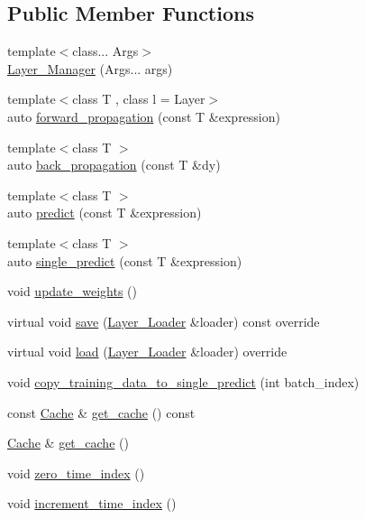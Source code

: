 \subsection*{Public Member Functions}
\begin{DoxyCompactItemize}
\item 
{\footnotesize template$<$class... Args$>$ }\\\hyperlink{structbc_1_1nn_1_1Layer__Manager_a6380a6af1c2939a1c8ddb85f7afdc56d}{Layer\+\_\+\+Manager} (Args... args)
\item 
{\footnotesize template$<$class T , class l  = Layer$>$ }\\auto \hyperlink{structbc_1_1nn_1_1Layer__Manager_a92fe4d1139a4e6a06918241e5869dd04}{forward\+\_\+propagation} (const T \&expression)
\item 
{\footnotesize template$<$class T $>$ }\\auto \hyperlink{structbc_1_1nn_1_1Layer__Manager_ae3ce714c4ab44c3b0422e4f496c41467}{back\+\_\+propagation} (const T \&dy)
\item 
{\footnotesize template$<$class T $>$ }\\auto \hyperlink{structbc_1_1nn_1_1Layer__Manager_a1cfda4ed795fa9a5193673f0e62e428a}{predict} (const T \&expression)
\item 
{\footnotesize template$<$class T $>$ }\\auto \hyperlink{structbc_1_1nn_1_1Layer__Manager_a1d600aa19f078f6f922134c87542a5c4}{single\+\_\+predict} (const T \&expression)
\item 
void \hyperlink{structbc_1_1nn_1_1Layer__Manager_a778156e80b4ede0516bb20d11c52cf3c}{update\+\_\+weights} ()
\item 
virtual void \hyperlink{structbc_1_1nn_1_1Layer__Manager_a56a0178f1067476e6891cbee68a0aacc}{save} (\hyperlink{structbc_1_1nn_1_1Layer__Loader}{Layer\+\_\+\+Loader} \&loader) const override
\item 
virtual void \hyperlink{structbc_1_1nn_1_1Layer__Manager_a1802dc0cfb6a4287ff5d45de6446feab}{load} (\hyperlink{structbc_1_1nn_1_1Layer__Loader}{Layer\+\_\+\+Loader} \&loader) override
\item 
void \hyperlink{structbc_1_1nn_1_1Layer__Manager_a3bf74352097075b764c7c5196f4c2218}{copy\+\_\+training\+\_\+data\+\_\+to\+\_\+single\+\_\+predict} (int batch\+\_\+index)
\item 
const \hyperlink{structbc_1_1nn_1_1Cache}{Cache} \& \hyperlink{structbc_1_1nn_1_1Layer__Manager_a4a6ff0e6ae647c1df47183cf17c7ad73}{get\+\_\+cache} () const
\item 
\hyperlink{structbc_1_1nn_1_1Cache}{Cache} \& \hyperlink{structbc_1_1nn_1_1Layer__Manager_a2fb6e5be07e3a0972c1e42ed5675927d}{get\+\_\+cache} ()
\item 
void \hyperlink{structbc_1_1nn_1_1Layer__Manager_ad0b46a663ef46dee13c2dffbd4c8b1f3}{zero\+\_\+time\+\_\+index} ()
\item 
void \hyperlink{structbc_1_1nn_1_1Layer__Manager_aa05263df7411cc3be9384d834eeb5525}{increment\+\_\+time\+\_\+index} ()
\end{DoxyCompactItemize}

